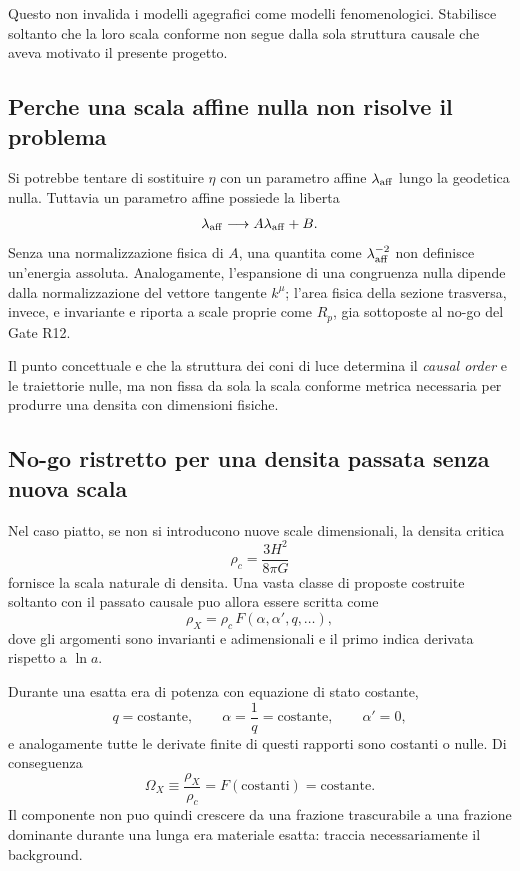 \documentclass[11pt,a4paper]{article}
\begin{document}
Questo non invalida i modelli agegrafici come modelli fenomenologici. Stabilisce soltanto che la loro scala conforme non segue dalla sola struttura causale che aveva motivato il presente progetto.

\subsection{Perche una scala affine nulla non risolve il problema}

Si potrebbe tentare di sostituire $\eta$ con un parametro affine $\lambda_{\rm aff}$ lungo la geodetica nulla. Tuttavia un parametro affine possiede la liberta
\begin{equation}
 \lambda_{\rm aff}\longrightarrow A\lambda_{\rm aff}+B.
\end{equation}
Senza una normalizzazione fisica di $A$, una quantita come $\lambda_{\rm aff}^{-2}$ non definisce un'energia assoluta. Analogamente, l'espansione di una congruenza nulla dipende dalla normalizzazione del vettore tangente $k^\mu$; l'area fisica della sezione trasversa, invece, e invariante e riporta a scale proprie come $R_p$, gia sottoposte al no-go del Gate R12.

Il punto concettuale e che la struttura dei coni di luce determina il \emph{causal order} e le traiettorie nulle, ma non fissa da sola la scala conforme metrica necessaria per produrre una densita con dimensioni fisiche.

\subsection{No-go ristretto per una densita passata senza nuova scala}

Nel caso piatto, se non si introducono nuove scale dimensionali, la densita critica
\begin{equation}
 \rho_c=\frac{3H^2}{8\pi G}
\end{equation}
fornisce la scala naturale di densita. Una vasta classe di proposte costruite soltanto con il passato causale puo allora essere scritta come
\begin{equation}
 \boxed{\rho_X=\rho_c\,F(\alpha,\alpha',q,\ldots)},
 \label{eq:r12b_general_past_density}
\end{equation}
dove gli argomenti sono invarianti e adimensionali e il primo indica derivata rispetto a $\ln a$.

Durante una esatta era di potenza con equazione di stato costante,
\begin{equation}
 q=\mathrm{costante},
 \qquad
 \alpha=\frac1q=\mathrm{costante},
 \qquad
 \alpha'=0,
\end{equation}
e analogamente tutte le derivate finite di questi rapporti sono costanti o nulle. Di conseguenza
\begin{equation}
 \boxed{\Omega_X\equiv\frac{\rho_X}{\rho_c}=F(\mathrm{costanti})=\mathrm{costante}}.
 \label{eq:r12b_tracking_theorem}
\end{equation}
Il componente non puo quindi crescere da una frazione trascurabile a una frazione dominante durante una lunga era materiale esatta: traccia necessariamente il background.
\end{document}

